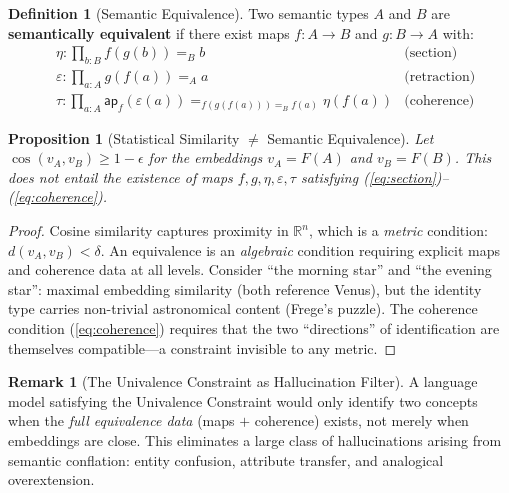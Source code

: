 \documentclass[11pt,a4paper,twocolumn]{article}
\theoremstyle{plain}
\newtheorem{proposition}[theorem]{Proposition}
\theoremstyle{definition}
\newtheorem{definition}[theorem]{Definition}
\newtheorem{remark}[theorem]{Remark}
\begin{document}
\begin{definition}[Semantic Equivalence]\label{def:sem-equiv}
Two semantic types $A$ and $B$ are \textbf{semantically equivalent} if there exist maps $f\colon A \to B$ and $g\colon B \to A$ with:
\begin{align}
  &\eta : \prod_{b:B} f(g(b)) =_B b  & \text{(section)} \label{eq:section} \\
  &\varepsilon : \prod_{a:A} g(f(a)) =_A a & \text{(retraction)} \label{eq:retract} \\
  &\tau : \prod_{a:A} \mathsf{ap}_f(\varepsilon(a)) =_{f(g(f(a))) =_B f(a)} \eta(f(a)) & \text{(coherence)} \label{eq:coherence}
\end{align}
\end{definition}

\begin{proposition}[Statistical Similarity $\neq$ Semantic Equivalence]\label{prop:sim-neq-equiv}
Let $\cos(v_A, v_B) \geq 1 - \epsilon$ for the embeddings $v_A = F(A)$ and $v_B = F(B)$. This does \emph{not} entail the existence of maps $f, g, \eta, \varepsilon, \tau$ satisfying (\ref{eq:section})--(\ref{eq:coherence}).
\end{proposition}

\begin{proof}
Cosine similarity captures proximity in $\mathbb{R}^n$, which is a \emph{metric} condition: $d(v_A, v_B) < \delta$. An equivalence is an \emph{algebraic} condition requiring explicit maps and coherence data at all levels. Consider ``the morning star'' and ``the evening star'': maximal embedding similarity (both reference Venus), but the identity type carries non-trivial astronomical content (Frege's puzzle). The coherence condition (\ref{eq:coherence}) requires that the two ``directions'' of identification are themselves compatible---a constraint invisible to any metric.
\end{proof}

\begin{remark}[The Univalence Constraint as Hallucination Filter]
A language model satisfying the Univalence Constraint would only identify two concepts when the \emph{full equivalence data} (maps $+$ coherence) exists, not merely when embeddings are close. This eliminates a large class of hallucinations arising from semantic conflation: entity confusion, attribute transfer, and analogical overextension.
\end{remark}

\end{document}
